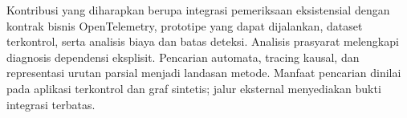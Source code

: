 Kontribusi yang diharapkan berupa integrasi pemeriksaan eksistensial dengan kontrak bisnis OpenTelemetry, prototipe yang dapat dijalankan, dataset terkontrol, serta analisis biaya dan batas deteksi. Analisis prasyarat melengkapi diagnosis dependensi eksplisit. Pencarian automata, tracing kausal, dan representasi urutan parsial menjadi landasan metode. Manfaat pencarian dinilai pada aplikasi terkontrol dan graf sintetis; jalur eksternal menyediakan bukti integrasi terbatas.
